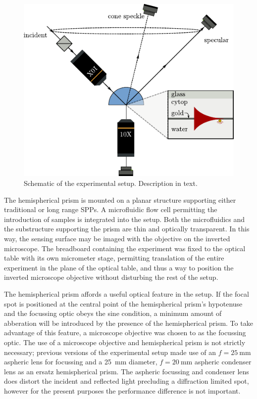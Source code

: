 \begin{figure}[ht]
\centering
 \includegraphics[keepaspectratio]{experimental/figures/conefig.pdf}
 \caption{Schematic of the experimental setup.  Description in text.}
\label{fig:experimentalsetup}
\end{figure}

The hemispherical prism is mounted on a planar structure supporting either
traditional or long range SPPs.  A microfluidic flow cell permitting the
introduction of samples is integrated into the setup.  Both the microfluidics
and the substructure supporting the prism are thin and optically transparent.
In this way, the sensing surface may be imaged with the objective on the
inverted microscope.  The breadboard containing the experiment was fixed to
the optical table with its own micrometer stage, permitting translation of the
entire experiment in the plane of the optical table, and thus a way to
position the inverted microscope objective without disturbing the rest of the
setup.

The hemispherical prism affords a useful optical feature in the setup.  If the
focal spot is positioned at the central point of the hemispherical prism's
hypotenuse and the focussing optic obeys the sine condition, a minimum amount
of abberation will be introduced by the presence of the hemispherical prism.
To take advantage of this feature, a microscope objective was chosen to as the
focussing optic.  The use of a microscope objective and hemispherical prism is
not strictly necessary; previous versions of the experimental setup made use
of an $f=\SI{25}{\milli\meter}$ aspheric lens for focussing and
a \SI{25}{\milli\meter} diameter, $f=\SI{20}{\milli\meter}$ aspheric condenser
lens as an ersatz hemispherical prism.  The aspheric focussing and condenser
lens does distort the incident and reflected light precluding a diffraction
limited spot, however for the present purposes the performance difference is
not important.

